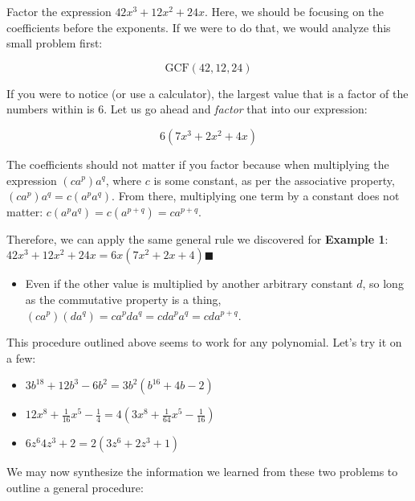 Factor the expression $42x^3+12x^2+24x$. Here, we should be focusing on the coefficients
before the exponents. If we were to do that, we would analyze this small problem first:



$$\text{GCF}(42,12,24)$$



If you were to notice (or use a calculator), the largest value that is a factor of the
numbers within is $6$. Let us go ahead and \textit{factor} that into our expression:



$$6\left(7x^3+2x^2+4x\right)$$



The coefficients should not matter if you factor because when multiplying the expression
$\left(ca^{p}\right)a^{q}$, where $c$ is some constant, as per the associative property,
$\left(ca^{p}\right)a^{q}=c\left(a^{p}a^{q}\right)$. From there, multiplying one term by a
constant does not matter: $c\left(a^{p}a^{q}\right)=c\left(a^{p+q}\right)=ca^{p+q}$.



Therefore, we can apply the same general rule we discovered for \textbf{Example 1}:
$42x^3+12x^2+24x=6x(7x^2+2x+4)\blacksquare$



\begin{itemize}
    \item Even if the other value is multiplied by another arbitrary constant $d$, so long as the commutative property is a thing, $\left(ca^{p}\right)\left(da^{q}\right)=ca^{p}da^{q}=cda^{p}a^{q}=cda^{p+q}$.
\end{itemize}

This procedure outlined above seems to work for any polynomial. Let's try it on a few:



\begin{itemize}
    \item $3b^{18}+12b^{3}-6b^{2}=3b^{2}\left(b^{16}+4b-2\right)$
    \item $12x^{8}+\frac{1}{16}x^{5}-\frac{1}{4}=4\left(3x^{8}+\frac{1}{64}x^{5}-\frac{1}{16}\right)$
    \item $6z^{6}4z^{3}+2=2\left(3z^{6}+2z^{3}+1\right)$
\end{itemize}

We may now synthesize the information we learned from these two problems to outline a
general procedure:



